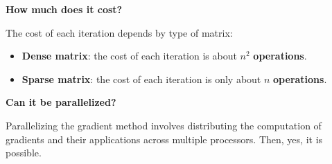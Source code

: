 \highspace
\begin{flushleft}
    \textcolor{Red2}{ \textbf{How much does it cost?}}
\end{flushleft}
The cost of each iteration depends by type of matrix:
\begin{itemize}
    \item \textbf{Dense matrix}: the cost of each iteration is about $n^{2}$ \textbf{operations}.
    \item \textbf{Sparse matrix}: the cost of each iteration is only about $n$ \textbf{operations}.
\end{itemize}

\highspace
\begin{flushleft}
    \textcolor{Green3}{ \textbf{Can it be parallelized?}}
\end{flushleft}
Parallelizing the gradient method involves distributing the computation of gradients and their applications across multiple processors. Then, yes, it is possible.

